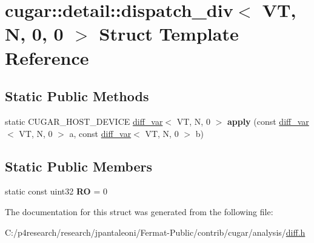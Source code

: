 \hypertarget{structcugar_1_1detail_1_1dispatch__div_3_01_v_t_00_01_n_00_010_00_010_01_4}{}\section{cugar\+:\+:detail\+:\+:dispatch\+\_\+div$<$ VT, N, 0, 0 $>$ Struct Template Reference}
\label{structcugar_1_1detail_1_1dispatch__div_3_01_v_t_00_01_n_00_010_00_010_01_4}
\subsection*{Static Public Methods}
\begin{DoxyCompactItemize}
\item 
\mbox{\label{structcugar_1_1detail_1_1dispatch__div_3_01_v_t_00_01_n_00_010_00_010_01_4_af0d5ff5a343bf7b113ff1ff145a65455}} 
static C\+U\+G\+A\+R\+\_\+\+H\+O\+S\+T\+\_\+\+D\+E\+V\+I\+CE \hyperlink{structcugar_1_1diff__var}{diff\+\_\+var}$<$ VT, N, 0 $>$ {\bfseries apply} (const \hyperlink{structcugar_1_1diff__var}{diff\+\_\+var}$<$ VT, N, 0 $>$ a, const \hyperlink{structcugar_1_1diff__var}{diff\+\_\+var}$<$ VT, N, 0 $>$ b)
\end{DoxyCompactItemize}
\subsection*{Static Public Members}
\begin{DoxyCompactItemize}
\item 
\mbox{\label{structcugar_1_1detail_1_1dispatch__div_3_01_v_t_00_01_n_00_010_00_010_01_4_ad257cd9f6c3ad2139768fab0ca178e46}} 
static const uint32 {\bfseries RO} = 0
\end{DoxyCompactItemize}


The documentation for this struct was generated from the following file\+:\begin{DoxyCompactItemize}
\item 
C\+:/p4research/research/jpantaleoni/\+Fermat-\/\+Public/contrib/cugar/analysis/\hyperlink{diff_8h}{diff.\+h}\end{DoxyCompactItemize}
